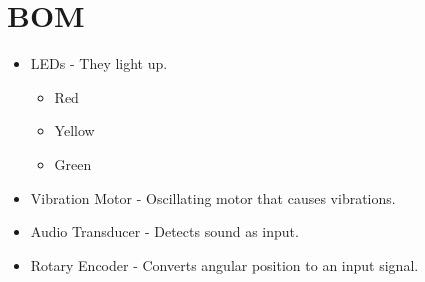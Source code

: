 \documentclass{article}
\begin{document}
\section{BOM}
\begin{itemize}
    \item LEDs - They light up.
    \begin{itemize}
        \item Red
        \item Yellow
        \item Green
    \end{itemize}
    \item Vibration Motor - Oscillating motor that causes vibrations.
    \item Audio Transducer - Detects sound as input.
    \item Rotary Encoder - Converts angular position to an input signal.
  \end{itemize}
\end{document}
